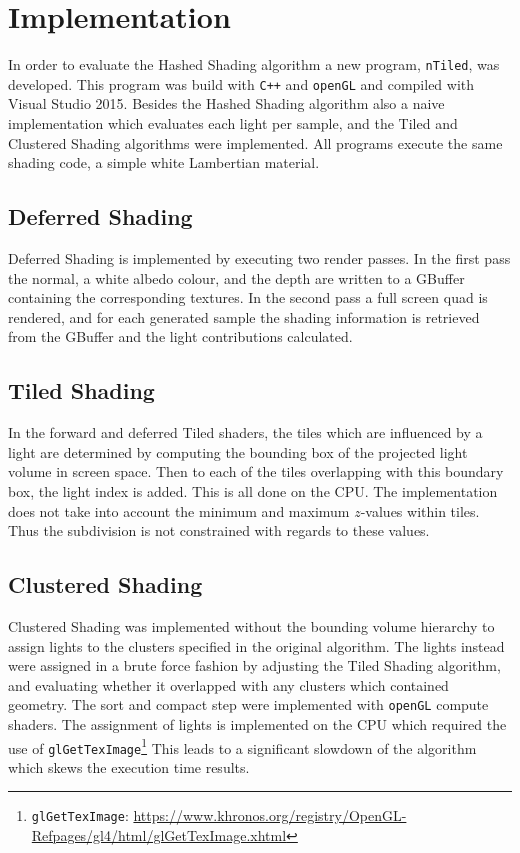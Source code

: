 \section{Implementation}

In order to evaluate the Hashed Shading algorithm a new program, \texttt{nTiled},
was developed. This program was build with \texttt{C++} and \texttt{openGL} and
compiled with Visual Studio 2015. 
Besides the Hashed Shading algorithm also a naive implementation which evaluates each
light per sample, and the Tiled and Clustered Shading algorithms were implemented.
All programs execute the same shading code, a simple white Lambertian material.

\subsection{Deferred Shading}

Deferred Shading is implemented by executing two render passes. In the first pass
the normal, a white albedo colour, and the depth are written to a GBuffer containing
the corresponding textures. In the second pass a full screen quad is rendered, and for
each generated sample the shading information is retrieved from the GBuffer and the
light contributions calculated.

\subsection{Tiled Shading}

In the forward and deferred Tiled shaders, the tiles which are influenced
by a light are determined by computing the bounding box of the projected light volume
in screen space\cite{mara20122d}. Then to each of the tiles overlapping with this
boundary box, the light index is added. This is all done on the CPU. The implementation
does not take into account the minimum and maximum $z$-values within tiles. Thus the
subdivision is not constrained with regards to these values.

\subsection{Clustered Shading}

Clustered Shading was implemented without the bounding volume hierarchy to assign
lights to the clusters specified in the original algorithm. The lights instead were
assigned in a brute force fashion by adjusting the Tiled Shading algorithm, and evaluating
whether it overlapped with any clusters which contained geometry. The sort and compact
step were implemented with \texttt{openGL} compute shaders. The assignment of lights is
implemented on the CPU which required the use of
\texttt{glGetTexImage}\footnote{\texttt{glGetTexImage}: {\tiny\url{https://www.khronos.org/registry/OpenGL-Refpages/gl4/html/glGetTexImage.xhtml}}}
This leads to a significant slowdown of the algorithm which skews the execution time results.

